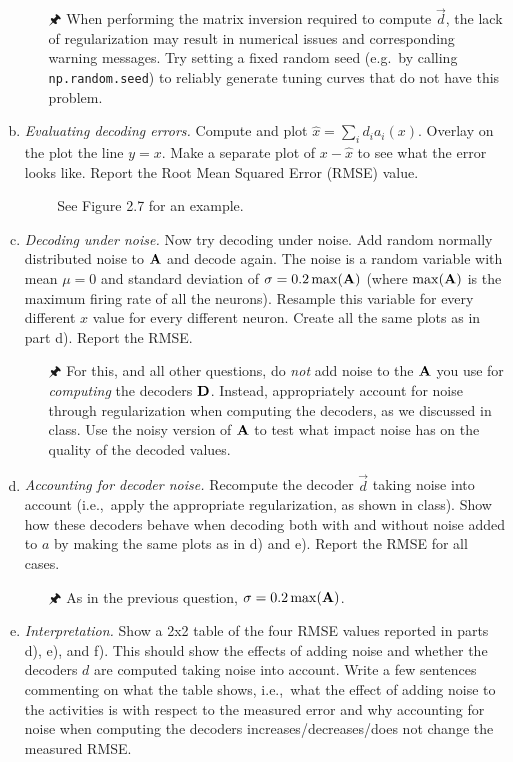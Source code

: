 \begin{enumerate}[a)]
		\begin{itemize}
			\item[{\symbolfont 🖈}] When performing the matrix inversion required to compute $\vec d$, the lack of regularization may result in numerical issues and corresponding warning messages. Try setting a fixed random seed (e.g.~by calling \texttt{np.random.seed}) to reliably generate tuning curves that do not have this problem.
		\end{itemize}
		\item {} \textit{Evaluating decoding errors.} Compute and plot $\hat{x}=\sum_i d_i a_i(x)$. Overlay on the plot the line $y=x$. Make a separate plot of $x-\hat{x}$ to see what the error looks like. Report the Root Mean Squared Error (RMSE) value.
		\begin{itemize}
			\item[{\symbolfont 📖}] See Figure 2.7 for an example.
		\end{itemize}
		\item {} \textit{Decoding under noise.} Now try decoding under noise. Add random normally distributed noise to ${\mathbf{A}}$ and decode again. The noise is a random variable with mean $\mu=0$ and standard deviation of $\sigma=0.2 \max({\mathbf{A}})$ (where $\max({\mathbf{A}})$ is the maximum firing rate of all the neurons). Resample this variable for every different $x$ value for every different neuron. Create all the same plots as in part d). Report the RMSE.
		\begin{itemize}
			 \item[{\symbolfont 🖈}] For this, and all other questions, do \textit{not} add noise to the ${\mathbf{A}}$ you use for \emph{computing} the decoders ${\mathbf{D}}$. Instead, appropriately account for noise through regularization when computing the decoders, as we discussed in class. Use the noisy version of ${\mathbf{A}}$ to test what impact noise has on the quality of the decoded values.
		\end{itemize}
		\item {} \textit{Accounting for decoder noise.} Recompute the decoder $\vec d$ taking noise into account (i.e.,~apply the appropriate regularization, as shown in class). Show how these decoders behave when decoding both with and without noise added to $a$ by making the same plots as in d) and e). Report the RMSE for all cases.
		\begin{itemize}
			\item[{\symbolfont 🖈}] As in the previous question, $\sigma = 0.2 \max({\mathbf{A}})$.
		\end{itemize}
		\item {} \textit{Interpretation.} Show a 2x2 table of the four RMSE values reported in parts d), e), and f). This should show the effects of adding noise and whether the decoders $d$ are computed taking noise into account. Write a few sentences commenting on what the table shows, i.e.,~what the effect of adding noise to the activities is with respect to the measured error and why accounting for noise when computing the decoders increases/decreases/does not change the measured RMSE.
	\end{enumerate}

